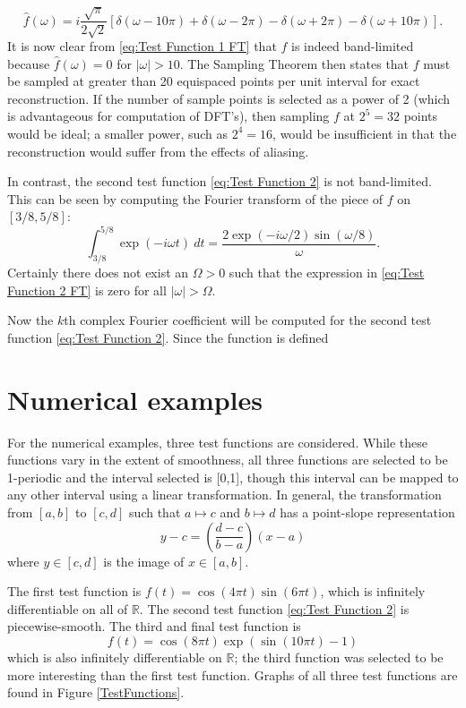 \documentclass[12pt]{article}
\begin{document}
\begin{equation}
\widehat{f}(\omega) = i\frac{\sqrt{\pi}}{2\sqrt{2}}\left[\delta(\omega - 10\pi) +\delta(\omega - 2\pi) - \delta(\omega + 2\pi) - \delta(\omega + 10\pi)\right].
\label{eq:Test Function 1 FT}
\end{equation}
It is now clear from \eqref{eq:Test Function 1 FT} that $f$ is indeed band-limited because $\widehat{f}(\omega) = 0$ for $|\omega| > 10$. The Sampling Theorem then states that $f$ must be sampled at greater than 20 equispaced points per unit interval for exact reconstruction. If the number of sample points is selected as a power of 2 (which is advantageous for computation of DFT's), then sampling $f$ at $2^5 = 32$ points would be ideal; a smaller power, such as $2^4 = 16$, would be insufficient in that the reconstruction would suffer from the effects of aliasing. \par 
In contrast, the second test function \eqref{eq:Test Function 2} is not band-limited. This can be seen by computing the Fourier transform of the piece of $f$ on $[3/8,5/8]$:
\begin{equation} 
\int_{3/8}^{5/8} \exp(-i\omega{t}) \: dt = \frac{2\exp(-i\omega/2)\sin(\omega/8)}{\omega}.
\label{eq:Test Function 2 FT}
\end{equation}
Certainly there does not exist an $\Omega > 0$ such that the expression in \eqref{eq:Test Function 2 FT} is zero for all $|\omega| > \Omega$. 

Now the $k$th complex Fourier coefficient will be computed for the second test function \eqref{eq:Test Function 2}. Since the function is defined

\newpage

\section{Numerical examples} \label{sec:Numerical examples}

For the numerical examples, three test functions are considered. While these functions vary in the extent of smoothness, all three functions are selected to be 1-periodic and the interval selected is [0,1], though this interval can be mapped to any other interval using a linear transformation. In general, the transformation from $[a,b]$ to $[c,d]$ such that $a \mapsto c$ and $b \mapsto d$ has a point-slope representation
\[y - c = \left(\frac{d-c}{b-a}\right)(x - a)\]
where $y \in [c,d]$ is the image of $x \in [a,b]$. \par
The first test function is $f(t) = \cos(4\pi{t})\sin(6\pi{t})$, which is infinitely differentiable on all of $\mathbb{R}$. The second test function \eqref{eq:Test Function 2} is piecewise-smooth. The third and final test function is
\begin{equation}
f(t) = \cos(8\pi{t})\exp(\sin(10\pi{t})-1)
\label{eq:Test Function 3}
\end{equation}
which is also infinitely differentiable on $\mathbb{R}$; the third function was selected to be more interesting than the first test function. Graphs of all three test functions are found in Figure \ref{TestFunctions}.  \par
\end{document}

